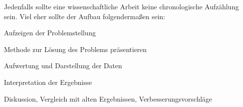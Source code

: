 Jedenfalls sollte eine wissenschaftliche Arbeit keine chronologische Aufzählung sein. Viel eher sollte der Aufbau folgendermaßen sein:
\begin{compactitem}
\item Aufzeigen der Problemstellung
\item Methode zur Lösung des Problems präsentieren
\item Aufwertung und Darstellung der Daten
\item Interpretation der Ergebnisse
\item Diskussion, Vergleich mit alten Ergebnissen, Verbesserungsvorschläge
\end{compactitem}
